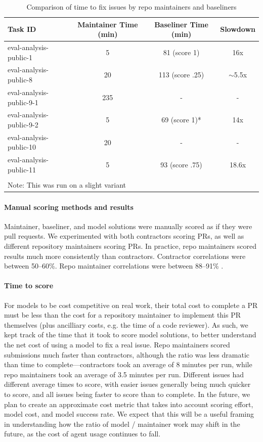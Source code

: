 \documentclass{article}
\begin{document}
\begin{table}[ht]
\centering
\begin{tabular}{lccc}
\hline
\textbf{Task ID} & \textbf{Maintainer Time (min)} & \textbf{Baseliner Time (min)} & \textbf{Slowdown} \\
\hline
eval-analysis-public-1 & 5 & 81 (score 1) & 16x \\
eval-analysis-public-8 & 20 & 113 (score .25) & $\sim$5.5x \\
eval-analysis-public-9-1 & 235 & - & - \\
eval-analysis-public-9-2 & 5 & 69 (score 1)* & 14x \\
eval-analysis-public-10 & 20 & - & - \\
eval-analysis-public-11 & 5 & 93 (score .75) & 18.6x \\
\hline\\
\multicolumn{4}{l}{\small *Note: This was run on a slight variant}
\end{tabular}
\label{tab:repo-maintainer}
\caption{Comparison of time to fix issues by repo maintainers and baseliners}
\end{table}

 \paragraph{Manual scoring methods and results} 
Maintainer, baseliner, and model solutions were manually scored as if they were pull requests. We experimented with both contractors scoring PRs, as well as different repository maintainers scoring PRs. In practice, repo maintainers scored results much more consistently than contractors. Contractor correlations were between 
{50--60\%}. Repo maintainer correlations were between 
{88--91\%} .
 \paragraph{Time to score} 
For models to be cost competitive on real work, their total cost to complete a PR must be less than the cost for a repository maintainer to implement this PR themselves (plus ancilliary costs, e.g. the time of a code reviewer). As such, we kept track of the time that it took to score model solutions, to better understand the net cost of using a model to fix a real issue.
Repo maintainers scored submissions much faster than contractors, although the ratio was less dramatic than time to complete---contractors took an average of 8 minutes per run, while repo maintainers took an average of 3.5 minutes per run. Different issues had different average times to score, with easier issues generally being much quicker to score, and all issues being faster to score than to complete.  In the future, we plan to create an approximate cost metric that takes into account scoring effort, model cost, and model success rate. We expect that this will be a useful framing in understanding how the ratio of model / maintainer work may shift in the future, as the cost of agent usage continues to fall.
\end{document}
